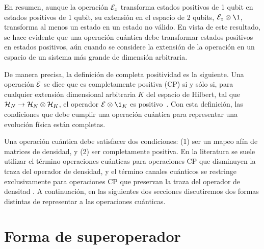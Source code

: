 En resumen, aunque la operación $\mathcal{E}_z$ transforma estados positivos
de 1 qubit en estados positivos de 1 qubit, 
su extensión en el espacio de 2 qubits, $\E_z\otimes\1$,
transforma al menos un estado en un estado no válido. 
En vista de este resultado, se hace evidente que una operación cuántica 
debe transformar estados positivos en estados positivos,
aún cuando se considere la extensión de la operación en 
un espacio de un sistema más grande de dimensión arbitraria.
 

De manera precisa, la definición de completa positividad es la siguiente.
Una operación $\mathcal{E}$ se dice que es completamente positiva (CP)
si y sólo si, para cualquier extensión dimensional arbitraria $K$ 
del espacio de Hilbert, tal que 
$\mathcal{H}_N \rightarrow \mathcal{H}_N \otimes \mathcal{H}_K$,
el operador $\E\otimes\1_K$ es positivo~\cite{bengtsson_zyczkowski_2017}. 
Con esta definición, las condiciones 
que debe cumplir una operación cuántica para representar una evolución física 
están completas.

Una operación cuántica debe satisfacer dos condiciones: (1)
ser un mapeo afín de matrices de densidad, y (2) ser completamente positiva. 
En la literatura se suele utilizar el término operaciones 
cuánticas para operaciones CP que disminuyen la traza 
del operador de densidad, y el término canales cuánticos 
se restringe exclusivamente para operaciones CP
que preservan la traza del 
operador de densitad \cite{bengtsson_zyczkowski_2017}. 
A continuación, en las siguientes dos secciones discutiremos 
dos formas distintas de representar a las operaciones cuánticas.



\section{Forma de superoperador} %

